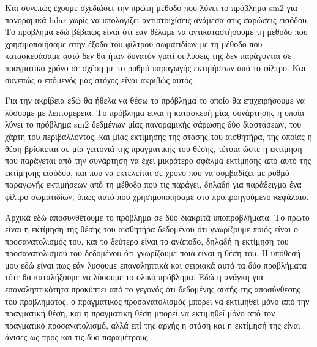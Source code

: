 \documentclass[a4paper,10pt]{article}
\begin{document}
Και συνεπώς έχουμε σχεδιάσει την πρώτη μέθοδο που λύνει το πρόβλημα sm2 για
πανοραμικά lidar χωρίς να υπολογίζει αντιστοιχίσεις ανάμεσα στις σαρώσεις
εισόδου. Το πρόβλημα εδώ βέβαιως είναι ότι εάν θέλαμε να αντικαταστήσουμε τη
μέθοδο που χρησιμοποιήσαμε στην έξοδο του φίλτρου σωματιδίων με τη μέθοδο που
κατασκευάσαμε αυτό δεν θα ήταν δυνατόν γιατί οι λύσεις της δεν παράγονται σε
πραγματικό χρόνο σε σχέση με το ρυθμό παραγωγής εκτιμήσεων από το φίλτρο.
Και συνεπώς ο επόμενός μας στόχος είναι ακριβώς αυτός.




Για την ακρίβεια εδώ θα ήθελα να θέσω το πρόβλημα το οποίο θα επιχειρήσουμε
να λύσουμε με λεπτομέρεια. Το πρόβλημα είναι η κατασκευή μίας συνάρτησης η
οποία λύνει το πρόβλημα sm2 δεδμένων μίας πανοραμικής σάρωσης δύο διαστάσεων,
του χάρτη του περιβάλλοντος, και μίας εκτίμησης της στάσης του αισθητήρα,
της οποίας η θέση βρίσκεται σε μία γειτονιά της πραγματικής του θέσης,
τέτοια ώστε η εκτίμηση που παράγεται από την συνάρτηση να έχει μικρότερο σφάλμα
εκτίμησης από αυτό της εκτίμησης εισόδου, και που να εκτελείται σε χρόνο που
να συμβαδίζει με ρυθμό παραγωγής εκτιμήσεων από τη μέθοδο που τις παράγει,
δηλαδή για παράδειγμα ένα φίλτρο σωματιδίων, όπως αυτό που χρησιμοποιήσαμε
στο προπροηγούμενο κεφάλαιο.


Αρχικά εδώ αποσυνθέτουμε το πρόβλημα σε δύο διακριτά υποπροβλήματα. Το πρώτο
είναι η εκτίμηση της θέσης του αισθητήρα δεδομένου ότι γνωρίζουμε ποιός είναι
ο προσανατολισμός του, και το δεύτερο είναι το ανάποδο, δηλαδή η εκτίμηση του
προσανατολισμού του δεδομένου ότι γνωρίζουμε ποιά είναι η θέση του. Η υπόθεσή
μου εδώ είναι πως εάν λυσουμε επαναληπτικά και σειριακά αυτά τα δύο προβλήματα
τότε θα καταλήξουμε να λύσουμε το ολικό πρόβλημα. Εδώ η ανάγκη για επαναληπτικότητα
προκύπτει από το γεγονός ότι δεδομένης αυτής της αποσύνθεσης του προβλήματος, ο
πραγματικός προσανατολισμός μπορεί να εκτιμηθεί μόνο από την πραγματική θέση,
και η πραγματική θέση μπορεί να εκτιμηθεί μόνο από τον πραγματικό
προσανατολισμό, αλλά επί της αρχής η στάση και η εκτίμησή της είναι άνισες
ως προς και τις δυο παραμέτρους.
\end{document}
